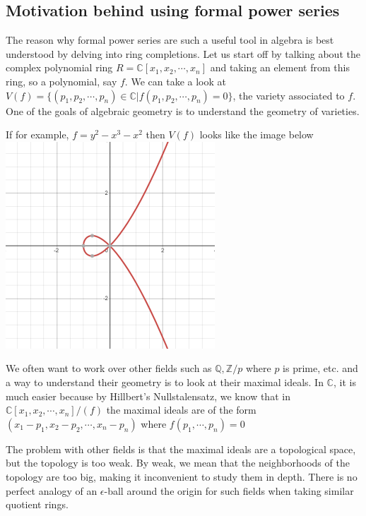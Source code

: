 \documentclass[11pt]{article}
\begin{document}
\hypertarget{motivation-behind-using-formal-power-series}{%
\subsection{Motivation behind using formal power
series}\label{motivation-behind-using-formal-power-series}}

The reason why formal power series are such a useful tool in algebra is
best understood by delving into ring completions. Let us start off by
talking about the complex polynomial ring
\(R= \mathbb{C}[x_1,x_2,\cdots,x_n]\) and taking an element from this
ring, so a polynomial, say \(f\). We can take a look at
\(V(f) = \{(p_1,p_2,\cdots,p_n)\in \mathbb{C} | f(p_1,p_2,\cdots,p_n) =0\}\),
the variety associated to \(f\). One of the goals of algebraic geometry
is to understand the geometry of varieties.

If for example, \(f = y^2-x^3-x^2\) then \(V(f)\) looks like the image
below \includegraphics[scale=0.5]{graph1.png}

We often want to work over other fields such as
\(\mathbb{Q}, \mathbb{Z}/p\) where \(p\) is prime, etc. and a way to
understand their geometry is to look at their maximal ideals. In
\(\mathbb{C}\), it is much easier because by Hillbert's Nullstalensatz,
we know that in \(\mathbb{C}[x_1,x_2,\cdots,x_n]/(f)\) the maximal
ideals are of the form \((x_1-p_1,x_2-p_2,\cdots,x_n-p_n)\) where
\(f(p_1,\cdots,p_n)=0\)

The problem with other fields is that the maximal ideals are a
topological space, but the topology is too weak. By weak, we mean that
the neighborhoods of the topology are too big, making it inconvenient to
study them in depth. There is no perfect analogy of an \(\epsilon\)-ball
around the origin for such fields when taking similar quotient rings.
\end{document}
